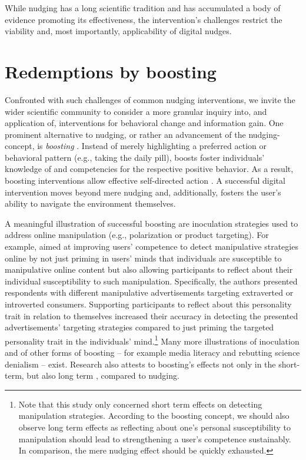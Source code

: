 \documentclass[reflection, authordate]{jote-new-article}
\begin{document}
While nudging has a long scientific tradition and has accumulated a body of evidence promoting its effectiveness, the intervention’s challenges restrict the viability and, most importantly, applicability of digital nudges.



\section{Redemptions by boosting}



Confronted with such challenges of common nudging interventions, we invite the wider scientific community to consider a more granular inquiry into, and application of, interventions for behavioral change and information gain. One prominent alternative to nudging, or rather an advancement of the nudging-concept, is \emph{boosting} \parencites[e.g.][]{Hertwig2017}{Hertwig2017a}. Instead of merely highlighting a preferred action or behavioral pattern (e.g., taking the daily pill), boosts foster individuals’ knowledge of and competencies for the respective positive behavior. As a result, boosting interventions allow effective self-directed action \parencites[e.g.][]{Lorenz-Spreen2021}. A successful digital intervention moves beyond mere nudging and, additionally, fosters the user’s ability to navigate the environment themselves.



A meaningful illustration of successful boosting are inoculation strategies used to address online manipulation (e.g., polarization or product targeting). For example, \textcite{Lorenz-Spreen2021} aimed at improving users’ competence to detect manipulative strategies online by not just priming in users’ minds that individuals are susceptible to manipulative online content but also allowing participants to reflect about their individual susceptibility to such manipulation. Specifically, the authors presented respondents with different manipulative advertisements targeting extraverted or introverted consumers. Supporting participants to reflect about this personality trait in relation to themselves increased their accuracy in detecting the presented advertisements’ targeting strategies compared to just priming the targeted personality trait in the individuals’ mind.\footnote{ Note that this study only concerned short term effects on detecting manipulation strategies. According to the boosting concept, we should also observe long term effects as reflecting about one’s personal susceptibility to manipulation should lead to strengthening a user’s competence sustainably. In comparison, the mere nudging effect should be quickly exhausted.} Many more illustrations of inoculation \parencites[e.g., as digital games][]{Basol2020}{HarropND} and of other forms of boosting – for example media literacy \parencites{Guess2020} and rebutting science denialism \parencites{Schmid2019} – exist. Research also attests to boosting’s effects not only in the short-term, but also long term \parencites[e.g.][]{Maertens2021}, compared to nudging.
\end{document}
